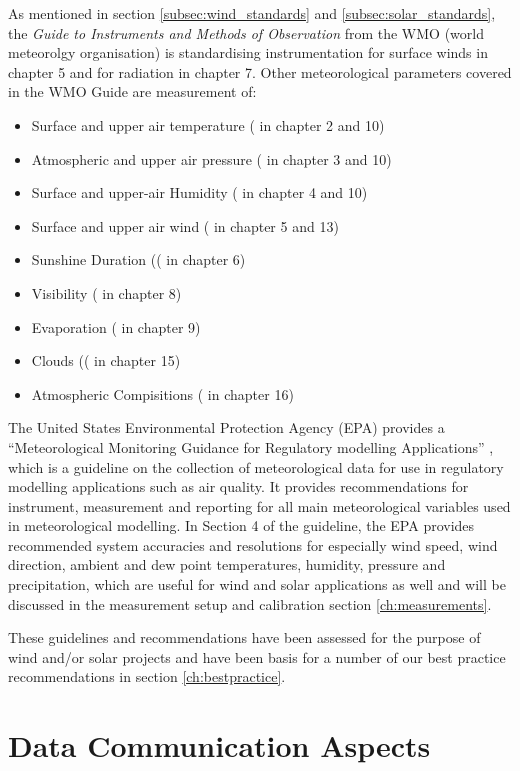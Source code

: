 As mentioned in section \ref{subsec:wind_standards} and \ref{subsec:solar_standards}, the \textit{Guide to Instruments and Methods of Observation} from the WMO (world meteorolgy organisation) \cite{wmoguide2018} is standardising  instrumentation for surface winds in chapter 5 and for radiation in chapter 7. Other meteorological parameters covered in the WMO Guide are measurement of:
\begin{itemize}
    \item Surface and upper air temperature (\cite{wmoguide2018} in chapter 2 and 10)
    \item Atmospheric and upper air pressure (\cite{wmoguide2018} in chapter 3 and 10)
    \item Surface and upper-air Humidity (\cite{wmoguide2018} in chapter 4 and 10)
    \item Surface and upper air wind (\cite{wmoguide2018} in chapter 5 and 13)
    \item Sunshine Duration ((\cite{wmoguide2018} in chapter 6)
    \item Visibility (\cite{wmoguide2018} in chapter 8)
    \item Evaporation (\cite{wmoguide2018} in chapter 9)
    \item Clouds ((\cite{wmoguide2018} in chapter 15)
    \item Atmospheric Compisitions (\cite{wmoguide2018} in chapter 16)
\end{itemize}

The United States Environmental Protection Agency (EPA) provides a “Meteorological Monitoring Guidance for Regulatory modelling Applications” \cite{EPA2000}, which is a guideline on the collection of meteorological data for use in regulatory modelling applications such as air quality. It provides recommendations for  instrument, measurement and reporting for all main meteorological variables used in meteorological modelling. In Section 4 of the guideline, the EPA provides recommended system accuracies and resolutions for especially wind speed, wind direction, ambient and dew point temperatures, humidity, pressure and precipitation, which are useful for wind and solar applications as well and will be discussed in the measurement setup and calibration section \ref{ch:measurements}.  

These guidelines and recommendations have been assessed for the purpose of wind and/or solar projects and have been basis for a number of our best practice recommendations in section \ref{ch:bestpractice}. 


\section{Data Communication Aspects }

{\color{magenta}{Contributing author: COM, JB, RP, JL}}{\color{blue}{ -- needs to be decided, whether we should have any of that here or refer to RP1 ?!}}